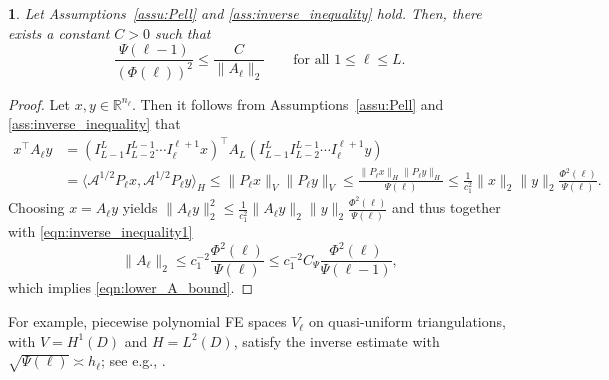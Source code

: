 \documentclass[11pt,english]{article}
\theoremstyle{plain}
\theoremstyle{plain}
\newtheorem{prop}[thm]{\protect\propositionname}
\theoremstyle{plain}
\theoremstyle{plain}
\numberwithin{equation}{section}
\providecommand{\propositionname}{Proposition}
\begin{document}
\begin{prop}\label{prop:assump}
	Let Assumptions~\ref{assu:Pell} and \ref{ass:inverse_inequality} hold. Then, there exists a constant $C>0$ such that
	\begin{equation}
		\frac{\Psi(\ell-1)}{(\Phi(\ell))^{2}}\leq\frac{C}{\|A_{\ell}\|_{2}}
		\qquad\text{for all $1\leq \ell\leq L$.}\label{eqn:lower_A_bound}
	\end{equation}
\end{prop}
\begin{proof}
  Let $x,y\in\mathbb{R}^{n_{\ell}}$. Then it follows from  Assumptions~\ref{assu:Pell} and \ref{ass:inverse_inequality} that
\begin{align*}
	x^{\top}A_{\ell}y
	 & =
	(I_{L-1}^L I_{L-2}^{L-1}\dotsb I_{\ell}^{\ell+1} x)^{\top}A_{L}(I_{L-1}^L I_{L-2}^{L-1}\dotsb I_{\ell}^{\ell+1}y)                 \\
	 &
	=
	\langle\mathcal{A}^{1/2}P_{\ell}x,\mathcal{A}^{1/2}P_{\ell}y\rangle_{H}  \leq\|P_{\ell}x\|_{V}\|P_{\ell}y\|_{V}  \leq \frac{\|P_{\ell}x\|_{H}\|P_{\ell}y\|_{H}}{\Psi(\ell)}
	\leq\frac{1}{c_{1}^{2}}\|x\|_{2}\|y\|_{2}\frac{\Phi^{2}(\ell)}{\Psi(\ell)}.
\end{align*}
Choosing $x=A_{\ell}y$ yields $\|A_{\ell}y\|_{2}^{2}\leq\frac{1}{c_{1}^{2}}\|A_{\ell}y\|_{2}\|y\|_{2}\frac{\Phi^{2}(\ell)}{\Psi(\ell)}$
and thus together with \eqref{eqn:inverse_inequality1}
\[
  \|A_{\ell}\|_{2} \le c_1^{-2} \frac{\Phi^{2}(\ell)}{\Psi(\ell)} \le  c_1^{-2}C_{\Psi}\frac{\Phi^{2}(\ell)}{\Psi(\ell-1)},
  \]
which implies  \eqref{eqn:lower_A_bound}. %
\end{proof}
For example, piecewise polynomial
FE spaces $V_{\ell}$ on quasi-uniform triangulations, with $V=H^{1}(D)$ and $H=L^{2}(D)$,
satisfy the inverse estimate with $\sqrt{\Psi(\ell)}\asymp h_{\ell}$;
see e.g., \cite[Prop.~6.3.2]{Quarteroni.A_Vali_book_1994_NAPDE}.
\end{document}

